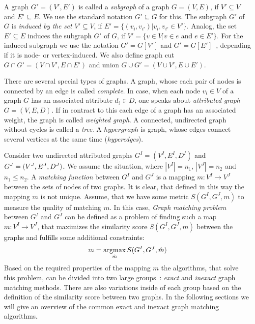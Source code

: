 A graph $G'=(V',E')$ is called a \emph{subgraph} of a graph $G=(V,E)$, if $V'\subseteq V$ and $E'\subseteq E$. We use the standard notation $G'\subseteq G$ for this. The subgraph $G'$ of $G$ is \emph{induced by the set $V'\subseteq V$}, if $E'=\{(v_i, v_{i'})|v_i,v_{i'}\in V'\}$. Analog, the set $E'\subseteq E$ induces the subgraph $G'$ of $G$, if $V'=\{v\in V|v\in e\text{ and }e\in E'\}$. For the induced subgraph we use the notation $G'=G[V']$ and $G'=G[E']$~\cite{Diestel2000}, depending if it is node- or vertex-induced. We also define graph cut $G\cap G'=(V\cap V', E\cap E')$ and union $G\cup G'=(V\cup V', E\cup E')$.

There are several special types of graphs. A graph, whose each pair of nodes is connected by an edge is called \emph{complete}. In case, when each node $v_i\in V$ of a graph $G$ has an associated attribute $d_i\in D$, one speaks about \emph{attributed graph} $G=(V,E,D)$. If in contract to this each edge of a graph has an associated weight, the graph is called \emph{weighted graph}. A connected, undirected graph without cycles is called a \emph{tree}. A $hypergraph$ is graph, whose edges connect several vertices at the same time (\emph{hyperedges}).

Consider two undirected attributed graphs $G^I = (V^I, E^I, D^I)$ and $G^J = (V^J, E^J,\newline D^J)$. We assume the situation, where $|V^I|=n_1$, $|V^J|=n_2$ and $n_1\le n_2$. A \emph{matching function} between $G^I$ and $G^J$ is a mapping $m:V^I\rightarrow V^J$ between the sets of nodes of two graphs.
It is clear, that defined in this way the mapping $m$ is not unique. Assume, that we have some metric $S(G^I, G^J, m)$ to measure the quality of matching $m$. In this case, \emph{Graph matching problem} between $G^I$ and $G^J$ can be defined as a problem of finding such a map $m:V^I\rightarrow V^J$, that maximizes the similarity score $S(G^I, G^J, m)$ between the graphs and fulfills some additional constraints:
\begin{equation} \label{gGMP}
m = \mathop{\rm argmax}_{\hat{m}}S(G^I, G^J, \hat{m})
\end{equation}
Based on the required properties of the mapping $m$ the algorithms, that solve this problem, can be divided into two large groups~\cite{Conte2004}: \emph{exact} and \emph{inexact} graph matching methods. There are also variations inside of each group based on the definition of the similarity score between two graphs. In the following sections we will give an overview of the common exact and inexact graph matching algorithms.
 
